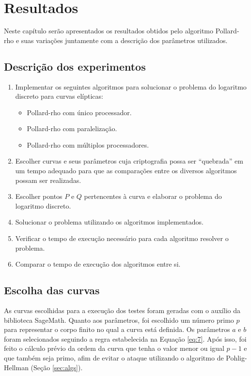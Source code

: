 \chapter{Resultados}
Neste capítulo serão apresentados os resultados obtidos pelo algoritmo Pollard-rho e suas variações juntamente com a descrição dos parâmetros utilizados.

\section{Descrição dos experimentos}
\begin{enumerate}

\item Implementar os seguintes algoritmos para solucionar o problema do logaritmo discreto para curvas elípticas:
  \begin{itemize}
  \item Pollard-rho com único processador.
  \item Pollard-rho com paralelização.
  \item Pollard-rho com múltiplos processadores.
  \end{itemize}
\item Escolher curvas e seus parâmetros cuja criptografia possa ser ``quebrada'' em um tempo adequado para que as comparações entre os diversos algoritmos possam ser realizadas.
\item Escolher pontos \(P\) e \(Q\) pertencentes à curva e elaborar o problema do logaritmo discreto.
\item Solucionar o problema utilizando os algoritmos implementados.
\item Verificar o tempo de execução necessário para cada algoritmo resolver o problema.
\item Comparar o tempo de execução dos algoritmos entre si.

\end{enumerate}

\section{Escolha das curvas}
As curvas escolhidas para a execução dos testes foram geradas com o auxílio da biblioteca SageMath. Quanto aos parâmetros, foi escolhido um número primo \(p\) para representar o corpo finito no qual a curva está definida. Os parâmetros \(a\) e \(b\) foram selecionados seguindo a regra estabelecida na Equação \ref{eq:7}. Após isso, foi feito o cálculo prévio da ordem da curva que tenha o valor menor ou igual \(p - 1\) e que também seja primo, afim de evitar o ataque utilizando o algoritmo de Pohlig-Hellman (Seção \ref{sec:algs}).


